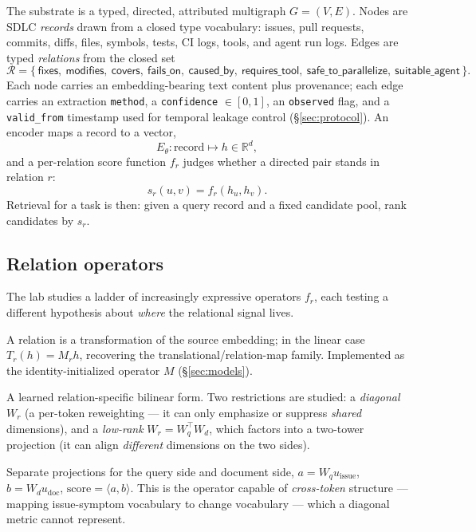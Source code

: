 \documentclass[11pt]{article}
\newcommand{\code}[1]{\texttt{#1}}
\newcommand{\rel}[1]{\textsf{#1}}
\begin{document}
The substrate is a typed, directed, attributed multigraph $G = (V, E)$. Nodes are
SDLC \emph{records} drawn from a closed type vocabulary: issues, pull requests,
commits, diffs, files, symbols, tests, CI logs, tools, and agent run logs. Edges
are typed \emph{relations} from the closed set
\[
\mathcal{R} = \{\,\rel{fixes},\ \rel{modifies},\ \rel{covers},\ \rel{fails\_on},\
\rel{caused\_by},\ \rel{requires\_tool},\ \rel{safe\_to\_parallelize},\
\rel{suitable\_agent}\,\}.
\]
Each node carries an embedding-bearing text content plus provenance; each edge
carries an extraction \code{method}, a \code{confidence} $\in [0,1]$, an
\code{observed} flag, and a \code{valid\_from} timestamp used for temporal leakage
control (\S\ref{sec:protocol}). An encoder maps a record to a vector,
\[
E_\theta : \text{record} \longmapsto h \in \mathbb{R}^d,
\]
and a per-relation score function $f_r$ judges whether a directed pair stands in
relation $r$:
\[
s_r(u,v) = f_r(h_u, h_v).
\]
Retrieval for a task is then: given a query record and a fixed candidate pool, rank
candidates by $s_r$.

\subsection{Relation operators}
\label{sec:operators}

The lab studies a ladder of increasingly expressive operators $f_r$, each testing a
different hypothesis about \emph{where} the relational signal lives.

\begin{description}[leftmargin=1.4em,style=nextline]
\item[Translational operator $h_v \approx T_r(h_u)$.]
A relation is a transformation of the source embedding; in the linear case
$T_r(h) = M_r h$, recovering the translational/relation-map family. Implemented as
the identity-initialized operator $M$ (\S\ref{sec:models}).
\item[Bilinear score $s_r(u,v) = h_u^{\top} W_r\, h_v$.]
A learned relation-specific bilinear form. Two restrictions are studied: a
\emph{diagonal} $W_r$ (a per-token reweighting --- it can only emphasize or
suppress \emph{shared} dimensions), and a \emph{low-rank} $W_r = W_q^{\top} W_d$,
which factors into a two-tower projection (it can align \emph{different} dimensions
on the two sides).
\item[Two-tower / low-rank projection.]
Separate projections for the query side and document side,
$a = W_q u_{\text{issue}}$, $b = W_d u_{\text{doc}}$, $\text{score} = \langle a, b
\rangle$. This is the operator capable of \emph{cross-token} structure --- mapping
issue-symptom vocabulary to change vocabulary --- which a diagonal metric cannot
represent.
\end{description}
\end{document}
